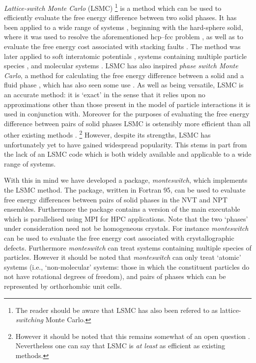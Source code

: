 \documentclass{report}
\begin{document}
\emph{Lattice-switch Monte Carlo} (LSMC) \cite{Bruce_1997,Bruce_2000} 
\footnote{The reader should be aware that LSMC has also been refered to as lattice-\emph{switching} Monte Carlo.}
is a method which can be used to efficiently evaluate the free energy difference between two solid phases.
It has been applied to a wide range of systems \cite{Bruce_1997,Pronk_1999,Mau_1999,Bruce_2000,Jackson_2002,Jackson_2007,Yang_2008,
Marechal_2008,Raiteri_2010,Wilms_2012,Quigley_2014,Bridgwater_2014,Underwood_2015},
beginning with the hard-sphere solid, where it was used to resolve the aforementioned hcp--fcc problem \cite{Bruce_1997,Bruce_2000},
as well as to evaluate the free energy cost associated with stacking faults \cite{Pronk_1999,Mau_1999}. 
The method was later applied to soft interatomic potentials \cite{Jackson_2002,Wilms_2012,Underwood_2015}, 
systems containing multiple particle species \cite{Jackson_2007,Yang_2008}, and molecular systems 
\cite{Marechal_2008,Raiteri_2010,Quigley_2014,Bridgwater_2014}.
LSMC has also inspired \emph{phase switch Monte Carlo}, a method for calculating the free energy difference between a solid and a
fluid phase \cite{Wilding_2000}, which has also seen some use
\cite{Wilding_2000,Errington_2004,McNeil-Watson_2006,Wilding_2009_MP,Wilding_2009_JCP,Sollich_2010,Wilding_2010}.
%
As well as being versatile, LSMC is an accurate method: it is `exact' in the sense that it relies upon no approximations other than those present in 
the model of particle interactions it is used in conjunction with. Moreover for the purposes of evaluating the free energy difference between 
pairs of solid phases LSMC is ostensibly more efficient than all other existing methods \cite{Wilms_2012,Marechal_2008}. 
\footnote{However it should be noted that this remains somewhat of an open question \cite{Pronk_1999,Sweatman_2015}. Nevertheless one can say that LSMC is 
\emph{at least} as efficient as existing methods.}
However, despite its strengths, LSMC has unfortunately yet to have gained widespread popularity. This stems in part from the lack of 
an LSMC code which is both widely available and applicable to a wide range of systems.

With this in mind we have developed a package, \emph{monteswitch}, which implements the LSMC method. The package, written in Fortran 95, can
be used to evaluate free energy differences between pairs of solid phases in the NVT and NPT ensembles. Furthermore the
package contains a version of the main executable which is parallelised using MPI for HPC applications.
Note that the two `phases' under consideration need not be homogeneous crystals. For instance \emph{monteswitch} can be used to evaluate the
free energy cost associated with crystallographic defects. Furthermore \emph{monteswitch} can treat systems containing multiple species of particles.
However it should be noted that \emph{monteswitch} can only treat `atomic' systems (i.e., `non-molecular' systems: those in which the constituent
particles do not have rotational degrees of freedom), and pairs of phases which can be represented by orthorhombic unit cells.
\end{document}
